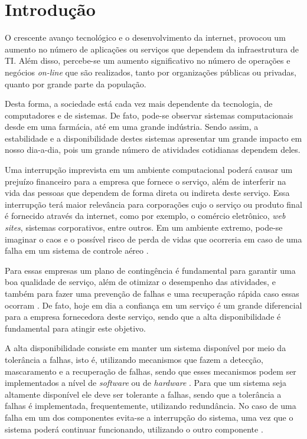 \chapter{Introdução}
O crescente avanço tecnológico e o desenvolvimento da internet, provocou um aumento no número de aplicações ou serviços que dependem da 
infraestrutura de \ac{TI}. Além disso, percebe-se um aumento significativo no número de operações e negócios \textit{on-line} que são realizados, 
tanto por organizações públicas ou privadas, quanto por grande parte da população.

Desta forma, a sociedade está cada vez mais dependente da tecnologia, de computadores e de sistemas. De fato, pode-se observar 
sistemas computacionais desde em uma farmácia, até em uma grande indústria. Sendo assim, a estabilidade e a disponibilidade destes 
sistemas apresentar um grande impacto em nosso dia-a-dia, pois um grande número de atividades cotidianas dependem deles.

Uma interrupção imprevista em um ambiente computacional poderá causar um prejuízo financeiro para a empresa que fornece o serviço, 
além de interferir na vida das pessoas que dependem de forma direta ou indireta deste serviço. 
Essa interrupção terá maior relevância para corporações cujo o serviço ou produto final é fornecido através da internet, 
como por exemplo, o comércio eletrônico, \textit{web sites}, sistemas corporativos, entre outros. 
Em um ambiente extremo, pode-se imaginar o caos e o possível risco de perda de vidas que ocorreria em caso de uma falha 
em um sistema de controle aéreo \cite{costa2009}.

Para essas empresas um plano de contingência é fundamental para garantir uma boa qualidade de serviço, além de otimizar o desempenho 
das atividades, e também para fazer uma prevenção de falhas e uma recuperação rápida caso essas ocorram \cite{costa2009}.
De fato, hoje em dia a confiança em um serviço é um grande diferencial para a empresa fornecedora deste serviço, 
sendo que a alta disponibilidade é fundamental para atingir este objetivo.

A alta disponibilidade consiste em manter um sistema disponível por meio da tolerância a falhas, isto é, utilizando mecanismos que fazem a 
detecção, mascaramento e a recuperação de falhas, sendo que esses mecanismos podem ser implementados a nível de \textit{software} ou de 
\textit{hardware} \cite{reis2009}. Para que um sistema seja altamente disponível ele deve ser tolerante a falhas, sendo que a tolerância
a falhas é implementada, frequentemente, utilizando redundância. No caso de uma falha em um dos componentes evita-se a interrupção do sistema,
uma vez que o sistema poderá continuar funcionando, utilizando o outro componente \cite{batista2007}.

